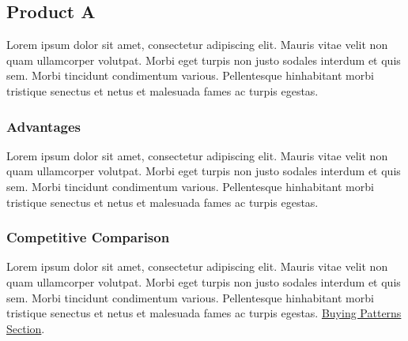 \documentclass[11pt]{article}
\begin{document}
\subsection{Product A}
Lorem ipsum dolor sit amet, consectetur adipiscing elit. Mauris vitae velit
non quam ullamcorper volutpat. Morbi eget turpis non justo sodales interdum
et quis sem. Morbi tincidunt condimentum various. Pellentesque hinhabitant morbi
tristique senectus et netus et malesuada fames ac turpis egestas.\newline

\subsubsection{Advantages}
Lorem ipsum dolor sit amet, consectetur adipiscing elit. Mauris vitae velit
non quam ullamcorper volutpat. Morbi eget turpis non justo sodales interdum
et quis sem. Morbi tincidunt condimentum various. Pellentesque hinhabitant morbi
tristique senectus et netus et malesuada fames ac turpis egestas.\newline

\subsubsection{Competitive Comparison}
Lorem ipsum dolor sit amet, consectetur adipiscing elit. Mauris vitae velit
non quam ullamcorper volutpat. Morbi eget turpis non justo sodales interdum
et quis sem. Morbi tincidunt condimentum various. Pellentesque hinhabitant morbi
tristique senectus et netus et malesuada fames ac turpis egestas.\newline
\hyperlink{competition_and_buying_patterns}{Buying Patterns Section}.\newline\newline
\end{document}
